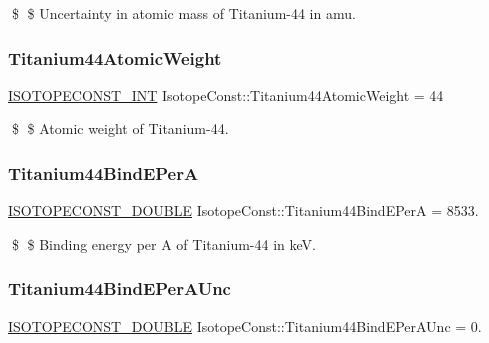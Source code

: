 \$ \$ Uncertainty in atomic mass of Titanium-\/44 in amu. \mbox{\label{group___isotope_const-_titanium-_ti44_ga956d4cc15d08664daa8f3f5f180dc21c}} 
\subsubsection{\texorpdfstring{Titanium44\+Atomic\+Weight}{Titanium44AtomicWeight}}
{\footnotesize\ttfamily \mbox{\hyperlink{group___isotope_const-_macros_ga5f18360b3e99483a35c32d789e62621c}{I\+S\+O\+T\+O\+P\+E\+C\+O\+N\+S\+T\+\_\+\+I\+NT}} Isotope\+Const\+::\+Titanium44\+Atomic\+Weight = 44}

\$ \$ Atomic weight of Titanium-\/44. \mbox{\label{group___isotope_const-_titanium-_ti44_ga55211150e99d1f9d53691a0e6026c574}} 
\subsubsection{\texorpdfstring{Titanium44\+Bind\+E\+PerA}{Titanium44BindEPerA}}
{\footnotesize\ttfamily \mbox{\hyperlink{group___isotope_const-_macros_ga8f45a7272ce02c0b4c65c44636ed719a}{I\+S\+O\+T\+O\+P\+E\+C\+O\+N\+S\+T\+\_\+\+D\+O\+U\+B\+LE}} Isotope\+Const\+::\+Titanium44\+Bind\+E\+PerA = 8533.}

\$ \$ Binding energy per A of Titanium-\/44 in keV. \mbox{\label{group___isotope_const-_titanium-_ti44_ga2e9dbee390c07dcbb8ca5df0c9b194b9}} 
\subsubsection{\texorpdfstring{Titanium44\+Bind\+E\+Per\+A\+Unc}{Titanium44BindEPerAUnc}}
{\footnotesize\ttfamily \mbox{\hyperlink{group___isotope_const-_macros_ga8f45a7272ce02c0b4c65c44636ed719a}{I\+S\+O\+T\+O\+P\+E\+C\+O\+N\+S\+T\+\_\+\+D\+O\+U\+B\+LE}} Isotope\+Const\+::\+Titanium44\+Bind\+E\+Per\+A\+Unc = 0.}

